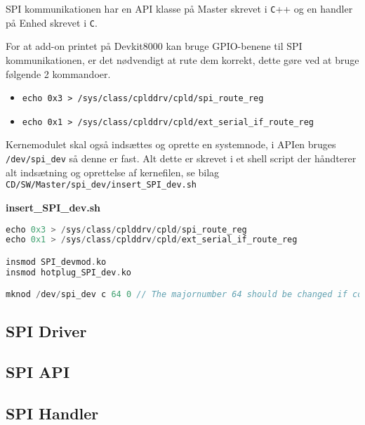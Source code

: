 


SPI kommunikationen har en API klasse på Master skrevet i \verb+C+++ og en handler på Enhed skrevet i \verb+C+.

For at add-on printet på Devkit8000 kan bruge GPIO-benene til SPI kommunikationen, er
det nødvendigt at rute dem korrekt, dette gøre ved at bruge følgende 2 kommandoer.


\begin{itemize}
\item \verb+echo 0x3 > /sys/class/cplddrv/cpld/spi_route_reg+
\item \verb+echo 0x1 > /sys/class/cplddrv/cpld/ext_serial_if_route_reg+
\end{itemize}

Kernemodulet skal også indsættes og oprette en systemnode, i APIen bruges \verb+/dev/spi_dev+ så denne er fast.
Alt dette er skrevet i et shell script der håndterer alt indsætning og oprettelse af kernefilen, se bilag \verb+CD/SW/Master/spi_dev/insert_SPI_dev.sh+

\textbf{insert\_SPI\_dev.sh}

\begin{lstlisting}[language=C]
echo 0x3 > /sys/class/cplddrv/cpld/spi_route_reg
echo 0x1 > /sys/class/cplddrv/cpld/ext_serial_if_route_reg

insmod SPI_devmod.ko
insmod hotplug_SPI_dev.ko

mknod /dev/spi_dev c 64 0 // The majornumber 64 should be changed if conflict occur
\end{lstlisting}


\subsection{SPI Driver}



\subsection{SPI API}




\subsection{SPI Handler}



